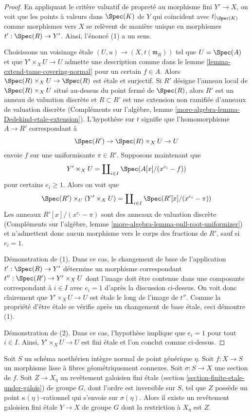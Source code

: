 \begin{proof}
En appliquant le critère valuatif de propreté au
morphisme fini $Y' \to X$, on voit que les points à valeurs dans $\Spec(K)$
de $Y$ qui coïncident avec $t|_{\Spec(K)}$ comme morphismes vers $X$
se relèvent de manière unique en morphismes $t' : \Spec(R) \to Y'$.
Ainsi, l'énoncé (1) a un sens.

\medskip\noindent
Choisissons un voisinage \'etale $(U, u) \to (X, t(\mathfrak m_R))$
tel que $U = \Spec(A)$ et que $Y' \times_X U \to U$
admette une description comme dans le lemme \ref{lemma-extend-tame-covering-normal}
pour un certain $f \in A$. Alors $\Spec(R) \times_X U \to \Spec(R)$ est \'etale
et surjectif. Si $R'$ désigne l'anneau local de
$\Spec(R) \times_X U$ situé au-dessus du point fermé de $\Spec(R)$,
alors $R'$ est un anneau de valuation discrète et $R \subset R'$
est une extension non ramifiée d'anneaux de valuation discrète
(Compléments sur l'algèbre, lemme \ref{more-algebra-lemma-Dedekind-etale-extension}).
L'hypothèse sur $t$ signifie que l'homomorphisme $A \to R'$
correspondant à
$$
\Spec(R') \to \Spec(R) \times_X U \to U
$$
envoie $f$ sur une uniformisante $\pi \in R'$. Supposons maintenant que
$$
Y' \times_X U =
\coprod\nolimits_{i \in I} \Spec(A[x]/(x^{e_i} - f))
$$
pour certains $e_i \geq 1$. Alors on voit que
$$
\Spec(R') \times_U (Y' \times_X U) =
\coprod\nolimits_{i \in I} \Spec(R'[x]/(x^{e_i} - \pi))
$$
Les anneaux $R'[x]/(x^{e_i} - \pi)$ sont des anneaux de valuation discrète
(Compléments sur l'algèbre, lemme \ref{more-algebra-lemma-pull-root-uniformizer})
et n'admettent donc aucun morphisme vers le corps des fractions de $R'$, sauf si $e_i = 1$.

\medskip\noindent
Démonstration de (1). Dans ce cas, le changement de base de l'application $t' : \Spec(R) \to Y'$
détermine un morphisme correspondant $t'' : \Spec(R') \to Y' \times_X U$
dont l'image doit être contenue dans une composante correspondant à $i \in I$ avec $e_i = 1$
d'après la discussion ci-dessus. On voit donc clairement que $Y' \times_X U \to U$
est \'etale le long de l'image de $t''$. Comme la propriété d'être \'etale
se vérifie après un changement de base \'etale, ceci démontre (1).

\medskip\noindent
Démonstration de (2). Dans ce cas, l'hypothèse implique que $e_i = 1$
pour tout $i \in I$. Ainsi, $Y' \times_X U \to U$ est fini \'etale
et l'on conclut comme ci-dessus.
\end{proof}

\begin{lemma}
\label{lemma-extend-covering}
Soit $S$ un schéma noethérien intègre normal de point générique $\eta$.
Soit $f : X \to S$ un morphisme lisse à fibres géométriquement connexes.
Soit $\sigma : S \to X$ une section de $f$. Soit $Z \to X_\eta$ un
revêtement galoisien fini \'etale (section \ref{section-finite-etale-under-galois})
de groupe $G$, dont l'ordre est inversible sur $S$, tel que
$Z$ possède un point $\kappa(\eta)$-rationnel qui s'envoie sur $\sigma(\eta)$.
Alors il existe un revêtement galoisien fini \'etale $Y \to X$ de groupe $G$
dont la restriction à $X_\eta$ est $Z$.
\end{lemma}

